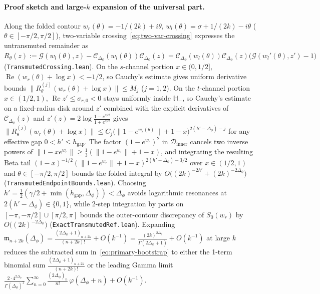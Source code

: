 \documentclass[10pt,a4paper]{article}
\theoremstyle{definition}
\begin{document}
\paragraph{Proof sketch and large-$k$ expansion of the universal part.}
Along the folded contour $w_r(\theta) = -1/(2k) + i\theta$, $w_l(\theta) = \sigma + 1/(2k) - i\theta$ ($\theta \in [-\pi/2, \pi/2]$), two-variable crossing~\eqref{eq:two-var-crossing} expresses the untransmuted remainder as $R_\theta(z) := \mathcal{G}(w_l(\theta), z) - \mathcal{C}_{\Delta_\phi}(w_l(\theta))\mathcal{C}_{\Delta_\phi}(z) = \mathcal{C}_{\Delta_\phi}(w_l(\theta))\mathcal{C}_{\Delta_\phi}(z)\bigl(\mathcal{G}(w_l'(\theta), z') - 1\bigr)$ (\texttt{TransmutedCrossing.lean}). On the $s$-channel portion $x \in (0, 1/2]$, $\operatorname{Re}(w_r(\theta) + \log x) < -1/2$, so Cauchy's estimate gives uniform derivative bounds $\|R_\theta^{(j)}(w_r(\theta) + \log x)\| \le M_j$ ($j = 1, 2$). On the $t$-channel portion $x \in (1/2, 1)$, $\operatorname{Re} z' \le \sigma_{r, 0} < 0$ stays uniformly inside $\mathbb{H}_-$, so Cauchy's estimate on a fixed-radius disk around $z'$ combined with the explicit derivatives of $\mathcal{C}_{\Delta_\phi}(z)$ and $z'(z) = 2\log\frac{1 - e^{z/2}}{1 + e^{z/2}}$ gives $\|R_\theta^{(j)}(w_r(\theta) + \log x)\| \le C_j \bigl(\|1 - e^{w_r(\theta)}\| + 1 - x\bigr)^{2(h' - \Delta_\phi) - j}$ for any effective gap $0 < h' \le h_{\mathrm{gap}}$. The factor $(1 - e^{w_r})^2$ in $\mathcal{D}_{\mathrm{inner}}$ cancels two inverse powers of $\|1 - x e^{w_r}\| \ge \frac{1}{3}(\|1 - e^{w_r}\| + 1 - x)$, and integrating the resulting Beta tail $(1 - x)^{-1/2}(\|1 - e^{w_r}\| + 1 - x)^{2(h' - \Delta_\phi) - 3/2}$ over $x \in (1/2, 1)$ and $\theta \in [-\pi/2, \pi/2]$ bounds the folded integral by $O\bigl((2k)^{-2 h'} + (2k)^{-2\Delta_\phi}\bigr)$ (\texttt{Transmuted\-Endpoint\-Bounds.lean}). Choosing $h' = \frac{1}{2}(\gamma/2 + \min(h_{\mathrm{gap}}, \Delta_\phi)) < \Delta_\phi$ avoids logarithmic resonances at $2(h' - \Delta_\phi) \in \{0, 1\}$, while 2-step integration by parts on $[-\pi, -\pi/2] \cup [\pi/2, \pi]$ bounds the outer-contour discrepancy of $S_0(w_r)$ by $O\bigl((2k)^{-2\Delta_\phi}\bigr)$ (\texttt{ExactTransmutedRef.lean}). Expanding $\mathfrak{m}_{n + 2k}(\Delta_\phi) = \frac{(2\Delta_\phi + 1)_{n + 2k}}{(n + 2k)!} + O(k^{-1}) = \frac{(2k)^{2\Delta_\phi}}{\Gamma(2\Delta_\phi + 1)} + O(k^{-1})$ at large $k$ reduces the subtracted sum in~\eqref{eq:primary-bootstrap} to either the 1-term binomial sum $\frac{(2\Delta_\phi + 1)_{n + 2k}}{(n + 2k)!}$ or the leading Gamma limit $\frac{2 \cdot 4^{2\Delta_\phi}}{\Gamma(\Delta_\phi)^2} \sum_{n=0}^{\infty} \frac{(2\Delta_\phi)_n}{n!} \, \varphi(\Delta_\phi + n) + O(k^{-1})$.
\end{document}
